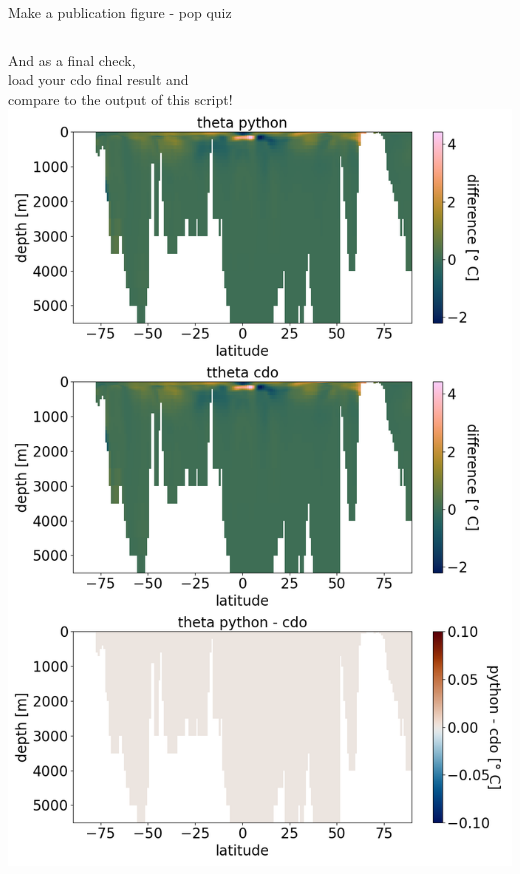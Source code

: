 \begin{frame}{\insertsectionnumber{ |} Make a publication figure - pop quiz}
    \begin{columns}
        \column[c]{5.5cm}
            And as a final check,\\
                \vspace{0.3cm}
             load your cdo final result and \\
                \vspace{0.3cm}
             compare to the output of this script! 
        \column[c]{6.5cm}             
            \includegraphics[scale=0.22]{images/script6_fig2.png}\\ 
    \end{columns}
\end{frame}

